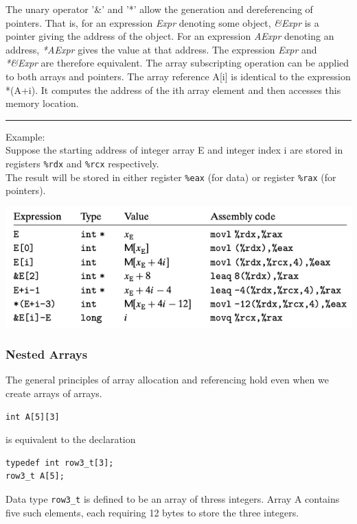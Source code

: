 \documentclass[11pt]{article}
\begin{document}
The unary operator '\&' and '*' allow the generation and dereferencing of pointers. That is, for an expression \emph{Expr} denoting some object, \emph{\&Expr} is a pointer giving the address of the object. For an expression \emph{AExpr} denoting an address, \emph{*AExpr} gives the value at that address. The expression \emph{Expr} and \emph{*\&Expr} are therefore equivalent. The array subscripting operation can be applied to both arrays and pointers. The array reference A[i] is identical to the expression *(A+i). It computes the address of the ith array element and then accesses this memory location.\\

\noindent\rule{\textwidth}{0.5pt}
Example:\\
Suppose the starting address of integer array E and integer index i are stored in registers \texttt{\%rdx} and \texttt{\%rcx} respectively.\\
The result will be stored in either register \texttt{\%eax} (for data) or register \texttt{\%rax} (for pointers).\\

\begin{center}
\includegraphics[width=.9\linewidth]{pics/array-expresion-examples.png}
\end{center}

\subsubsection{Nested Arrays}
\label{sec:orgadfdbc6}

The general principles of array allocation and referencing hold even when we create arrays of arrays.\\
\begin{verbatim}
int A[5][3]
\end{verbatim}
is equivalent to the declaration\\
\begin{verbatim}
typedef int row3_t[3];
row3_t A[5];
\end{verbatim}

Data type \texttt{row3\_t} is defined to be an array of thress integers. Array A contains five such elements, each requiring 12 bytes to store the three integers.\\
\end{document}
